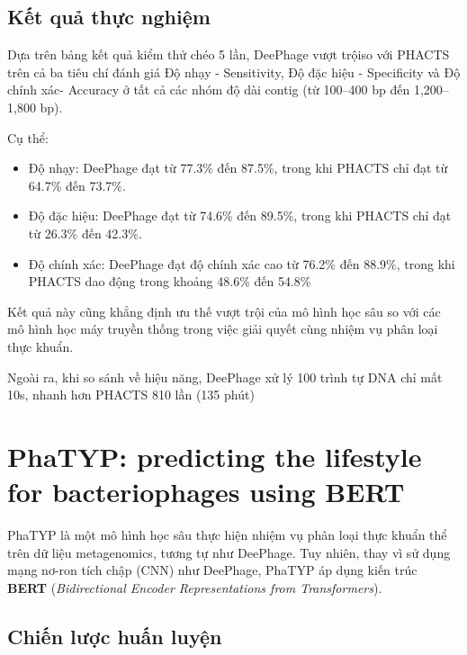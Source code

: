 \subsection*{Kết quả thực nghiệm}

Dựa trên bảng kết quả kiểm thử chéo 5 lần, DeePhage vượt trộiso với PHACTS trên cả ba tiêu chí đánh giá Độ nhạy - Sensitivity, Độ đặc hiệu - Specificity và Độ chính xác- Accuracy ở tất cả các nhóm độ dài contig (từ 100–400 bp đến 1,200–1,800 bp).

Cụ thể:
\begin{itemize}
    \item Độ nhạy: DeePhage đạt từ 77.3\% đến 87.5\%, trong khi PHACTS chỉ đạt từ 64.7\% đến 73.7\%. 
    \item Độ đặc hiệu: DeePhage đạt từ 74.6\% đến 89.5\%, trong khi PHACTS chỉ đạt từ 26.3\% đến 42.3\%.
    \item Độ chính xác: DeePhage đạt độ chính xác cao từ 76.2\% đến 88.9\%, trong khi PHACTS dao động trong khoảng 48.6\% đến 54.8\%
\end{itemize}

Kết quả này cũng khẳng định ưu thế vượt trội của mô hình học sâu so với các mô hình học máy truyền thống trong việc giải quyết cùng nhiệm vụ phân loại thực khuẩn.

Ngoài ra, khi so sánh về hiệu năng, DeePhage xử lý 100 trình tự DNA chỉ mất 10s, nhanh hơn PHACTS 810 lần (135 phút)

\section{PhaTYP: predicting the lifestyle for bacteriophages using BERT \cite{PhaTYP_10.1093/bib/bbac487}}

PhaTYP là một mô hình học sâu thực hiện nhiệm vụ phân loại thực khuẩn thể trên dữ liệu metagenomics, tương tự như DeePhage. Tuy nhiên, thay vì sử dụng mạng nơ-ron tích chập (CNN) như DeePhage, PhaTYP áp dụng kiến trúc \textbf{BERT} (\textit{Bidirectional Encoder Representations from Transformers}). 

\subsection*{Chiến lược huấn luyện}

